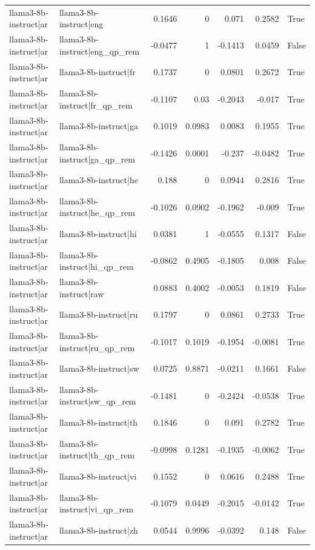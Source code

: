 \begin{table}
\begin{tabular}{l l r r r r l}
llama3-8b-instruct|ar & llama3-8b-instruct|eng & 0.1646 & 0 & 0.071 & 0.2582 & True \\
llama3-8b-instruct|ar & llama3-8b-instruct|eng_qp_rem & -0.0477 & 1 & -0.1413 & 0.0459 & False \\
llama3-8b-instruct|ar & llama3-8b-instruct|fr & 0.1737 & 0 & 0.0801 & 0.2672 & True \\
llama3-8b-instruct|ar & llama3-8b-instruct|fr_qp_rem & -0.1107 & 0.03 & -0.2043 & -0.017 & True \\
llama3-8b-instruct|ar & llama3-8b-instruct|ga & 0.1019 & 0.0983 & 0.0083 & 0.1955 & True \\
llama3-8b-instruct|ar & llama3-8b-instruct|ga_qp_rem & -0.1426 & 0.0001 & -0.237 & -0.0482 & True \\
llama3-8b-instruct|ar & llama3-8b-instruct|he & 0.188 & 0 & 0.0944 & 0.2816 & True \\
llama3-8b-instruct|ar & llama3-8b-instruct|he_qp_rem & -0.1026 & 0.0902 & -0.1962 & -0.009 & True \\
llama3-8b-instruct|ar & llama3-8b-instruct|hi & 0.0381 & 1 & -0.0555 & 0.1317 & False \\
llama3-8b-instruct|ar & llama3-8b-instruct|hi_qp_rem & -0.0862 & 0.4905 & -0.1805 & 0.008 & False \\
llama3-8b-instruct|ar & llama3-8b-instruct|raw & 0.0883 & 0.4002 & -0.0053 & 0.1819 & False \\
llama3-8b-instruct|ar & llama3-8b-instruct|ru & 0.1797 & 0 & 0.0861 & 0.2733 & True \\
llama3-8b-instruct|ar & llama3-8b-instruct|ru_qp_rem & -0.1017 & 0.1019 & -0.1954 & -0.0081 & True \\
llama3-8b-instruct|ar & llama3-8b-instruct|sw & 0.0725 & 0.8871 & -0.0211 & 0.1661 & False \\
llama3-8b-instruct|ar & llama3-8b-instruct|sw_qp_rem & -0.1481 & 0 & -0.2424 & -0.0538 & True \\
llama3-8b-instruct|ar & llama3-8b-instruct|th & 0.1846 & 0 & 0.091 & 0.2782 & True \\
llama3-8b-instruct|ar & llama3-8b-instruct|th_qp_rem & -0.0998 & 0.1281 & -0.1935 & -0.0062 & True \\
llama3-8b-instruct|ar & llama3-8b-instruct|vi & 0.1552 & 0 & 0.0616 & 0.2488 & True \\
llama3-8b-instruct|ar & llama3-8b-instruct|vi_qp_rem & -0.1079 & 0.0449 & -0.2015 & -0.0142 & True \\
llama3-8b-instruct|ar & llama3-8b-instruct|zh & 0.0544 & 0.9996 & -0.0392 & 0.148 & False \\

\end{tabular}
\end{table}
